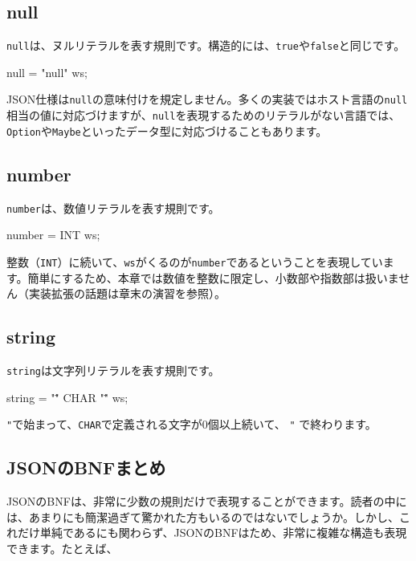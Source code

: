 \subsection{null}

\texttt{null}は、ヌルリテラルを表す規則です。構造的には、\texttt{true}や\texttt{false}と同じです。

\begin{codescreen}{}
null = "null" ws;
\end{codescreen}

JSON仕様は\texttt{null}の意味付けを規定しません。多くの実装ではホスト言語の\texttt{null}相当の値に対応づけますが、\texttt{null}を表現するためのリテラルがない言語では、\texttt{Option}や\texttt{Maybe}といったデータ型に対応づけることもあります。

\subsection{number}

\texttt{number}は、数値リテラルを表す規則です。

\begin{codescreen}{}
number = INT ws;
\end{codescreen}

整数（\texttt{INT}）に続いて、\texttt{ws}がくるのが\texttt{number}であるということを表現しています。簡単にするため、本章では数値を整数に限定し、小数部や指数部は扱いません（実装拡張の話題は章末の演習を参照）。

\subsection{string}

\texttt{string}は文字列リテラルを表す規則です。

\begin{codescreen}{}
string = "\"" {CHAR} "\"" ws;
\end{codescreen}

\texttt{"}で始まって、\texttt{CHAR}で定義される文字が0個以上続いて、
\texttt{"}
で終わります。

\subsection{JSONのBNFまとめ}

JSONのBNFは、非常に少数の規則だけで表現することができます。読者の中には、あまりにも簡潔過ぎて驚かれた方もいるのではないでしょうか。しかし、これだけ単純であるにも関わらず、JSONのBNFはため、非常に複雑な構造も表現できます。たとえば、

